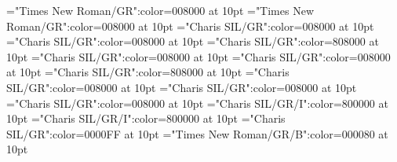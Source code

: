 \documentclass[a4paper,twoside]{article}
\begin{document}
\font\sensespanmainentrysubsensessensessensespanspanentryletDatadicBody="Times New Roman/GR":color=008000 at 10pt
\font\spansensespanmainentrysubsensessensessensespanspanentryletDatadicBody="Times New Roman/GR":color=008000 at 10pt
\font\spanesspansensespanmainentrysubsensessensessensespanspanentryletDatadicBody="Charis SIL/GR":color=008000 at 10pt
\font\spanspansensespanmainentrysubsensessensessensespanspanentryletDatadicBody="Charis SIL/GR":color=008000 at 10pt
\font\restrictionssensespanmainentrysubsensessensessensespanspanentryletDatadicBody="Charis SIL/GR":color=808000 at 10pt
\font\spanesrestrictionssensespanmainentrysubsensessensessensespanspanentryletDatadicBody="Charis SIL/GR":color=008000 at 10pt
\font\spanspanesrestrictionssensespanmainentrysubsensessensessensespanspanentryletDatadicBody="Charis SIL/GR":color=008000 at 10pt
\font\spanrestrictionssensespanmainentrysubsensessensessensespanspanentryletDatadicBody="Charis SIL/GR":color=808000 at 10pt
\font\spanspanmainentrysubsensessensessensespanspanentryletDatadicBody="Charis SIL/GR":color=008000 at 10pt
\font\spanspanspanspanentryletDatadicBody="Charis SIL/GR":color=008000 at 10pt
\font\spanspanspanspanspanentryletDatadicBody="Charis SIL/GR":color=008000 at 10pt
\font\spanesspanspanspanspanspanentryletDatadicBody="Charis SIL/GR/I":color=800000 at 10pt
\font\spanabbreviationvariantentrytypevariantentrytypesvariantformentrybackrefsentryspanspanspanspanspanentryletDatadicBody="Charis SIL/GR/I":color=800000 at 10pt
\font\headwordspanspanentryletDatadicBody="Charis SIL/GR":color=0000FF at 10pt
\font\spanmxbheadwordspanspanentryletDatadicBody="Times New Roman/GR/B":color=000080 at 10pt
\end{document}
